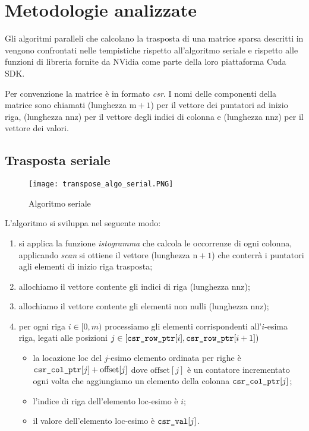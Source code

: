 
\section{Metodologie analizzate}\label{metodologie}

Gli algoritmi paralleli che calcolano la trasposta di una matrice sparsa descritti in \cite{parallelTrans} vengono confrontati nelle tempistiche rispetto all'algoritmo seriale e rispetto alle funzioni di libreria \cuSPARSE fornite da NVidia come parte della loro piattaforma Cuda SDK. 

Per convenzione la matrice è in formato \emph{csr}. I nomi delle componenti della matrice sono chiamati  (lunghezza $\mathrm{m}+1$) per il vettore dei puntatori ad inizio riga,  (lunghezza $\mathrm{nnz}$) per il vettore degli indici di colonna e  (lunghezza $\mathrm{nnz}$) per il vettore dei valori. 
		
\subsection{Trasposta seriale}

\begin{figure}[htbp]
    \centering
	\texttt{[image: transpose\_algo\_serial.PNG]}
	\caption{Algoritmo seriale}
	\label{transpose_algo_serial}
\end{figure}

L'algoritmo si sviluppa nel seguente modo:
\begin{enumerate}
    \item si applica la funzione \emph{istogramma}  che calcola le occorrenze di ogni colonna, applicando \emph{scan} si ottiene il vettore  (lunghezza $\mathrm{n}+1$) che conterrà i puntatori agli elementi di inizio riga trasposta;
    \item allochiamo il vettore  contente gli indici di riga (lunghezza $\mathrm{nnz}$);
    \item allochiamo il vettore  contente gli elementi non nulli (lunghezza $\mathrm{nnz}$);
    \item per ogni riga $i \in [0, m)$ processiamo gli elementi corrispondenti all'$i$-esima riga, legati alle posizioni $j \in [\texttt{csr\_row\_ptr}[i], \texttt{csr\_row\_ptr}[i+1])$
    \begin{itemize}
        \item la locazione $\mathrm{loc}$ del $j$-esimo elemento ordinata per righe è $\texttt{csr\_col\_ptr}[j] + \mathrm{offset}[j]$ dove $\mathrm{offset}[j]$ è un contatore incrementato ogni volta che aggiungiamo un elemento della colonna $\texttt{csr\_col\_ptr}[j]$;
        \item l'indice di riga dell'elemento $\mathrm{loc}$-esimo è $i$;
        \item il valore dell'elemento  $\mathrm{loc}$-esimo è $\texttt{csr\_val}[j]$.
    \end{itemize}
\end{enumerate}

